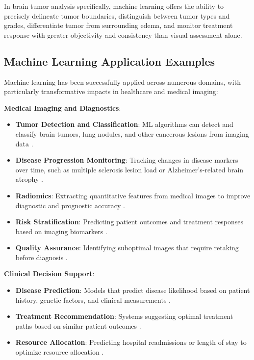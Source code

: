 In brain tumor analysis specifically, machine learning offers the ability to precisely delineate tumor boundaries, distinguish between tumor types and grades, differentiate tumor from surrounding edema, and monitor treatment response with greater objectivity and consistency than visual assessment alone.

\subsection{Machine Learning Application Examples}
\label{sec:ml_applications}
Machine learning has been successfully applied across numerous domains, with particularly transformative impacts in healthcare and medical imaging:

\textbf{Medical Imaging and Diagnostics}:
\begin{itemize}
  \item \textbf{Tumor Detection and Classification}: ML algorithms can detect and classify brain tumors, lung nodules, and other cancerous lesions from imaging data \cite{wang2019machine}.
  \item \textbf{Disease Progression Monitoring}: Tracking changes in disease markers over time, such as multiple sclerosis lesion load or Alzheimer's-related brain atrophy \cite{mortaheb2019machine}.
  \item \textbf{Radiomics}: Extracting quantitative features from medical images to improve diagnostic and prognostic accuracy \cite{lambin2012radiomics}.
  \item \textbf{Risk Stratification}: Predicting patient outcomes and treatment responses based on imaging biomarkers \cite{aerts2014decoding}.
  \item \textbf{Quality Assurance}: Identifying suboptimal images that require retaking before diagnosis \cite{esses2018automated}.
\end{itemize}

\textbf{Clinical Decision Support}:
\begin{itemize}
  \item \textbf{Disease Prediction}: Models that predict disease likelihood based on patient history, genetic factors, and clinical measurements \cite{deo2015machine}.
  \item \textbf{Treatment Recommendation}: Systems suggesting optimal treatment paths based on similar patient outcomes \cite{beam2018clinical}.
  \item \textbf{Resource Allocation}: Predicting hospital readmissions or length of stay to optimize resource allocation \cite{futoma2015comparison}.
\end{itemize}

